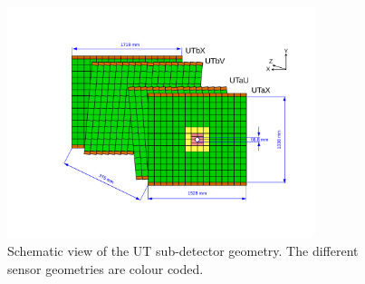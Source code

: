 \begin{figure}[!tb]
\centering
\includegraphics[width=0.8\textwidth]{figs/detector/ut.pdf}
\caption{Schematic view of the UT sub-detector geometry. The different sensor geometries are colour coded.}
\label{fig:ut}
\end{figure}
